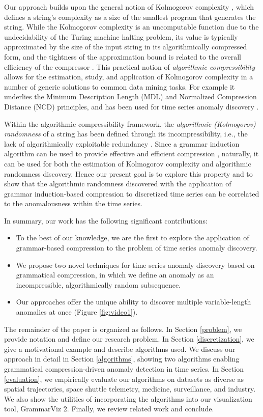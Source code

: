 \documentclass{sig-alternate}
\begin{document}
Our approach builds upon the general notion of Kolmogorov complexity \cite{kolmogorov}, which defines a string's complexity as a size of the smallest program that generates the string. While the Kolmogorov complexity is an uncomputable function due to the undecidability of the Turing machine halting problem, its value is typically approximated by the size of the input string in its algorithmically compressed form, and the tightness of the approximation bound is related to the overall efficiency of the compressor \cite{solomonoff, li_vitanyi}. This practical notion of \textit{algorithmic compressibility} allows for the estimation, study, and application of Kolmogorov complexity in a number of generic solutions to common data mining tasks. For example it underlies the Minimum Description Length (MDL) \cite{mdl} and Normalized Compression Distance (NCD) \cite{ncd} principles, and has been used for time series anomaly discovery \cite{param_free}.

Within the algorithmic compressibility framework, the \textit{algorithmic (Kolmogorov) randomness} of a string has been defined through its incompressibility, i.e., the lack of algorithmically exploitable redundancy \cite{li_vitanyi, mdl, grigorieff, per_lof}. Since a grammar induction algorithm can be used to provide effective and efficient compression  \cite{compression}, naturally, it can be used for both the estimation of Kolmogorov complexity and algorithmic randomness discovery. Hence our present goal is to explore this property and to show that the algorithmic randomness discovered with the application of grammar induction-based compression to discretized time series can be correlated to the anomalousness within the time series.

In summary, our work has the following significant contributions:
\begin{itemize}
\item To the best of our knowledge, we are the first to explore the application of grammar-based compression to the problem of time series anomaly discovery.
\item We propose two novel techniques for time series anomaly discovery based on grammatical compression, in which we define an anomaly as an incompressible, algorithmically random subsequence.
\item Our approaches offer the unique ability to discover multiple variable-length anomalies at once (Figure \ref{fig:video1}).
\end{itemize}
The remainder of the paper is organized as follows. In Section \ref{problem}, we provide notation and define our research problem. In Section \ref{discretization}, we give a motivational example and describe algorithms used. We discuss our approach in detail in Section \ref{algorithms}, showing two algorithms enabling grammatical compression-driven anomaly detection in time series. In Section \ref{evaluation}, we empirically evaluate our algorithms on datasets as diverse as spatial trajectories, space shuttle telemetry, medicine, surveillance, and industry. We also show the utilities of incorporating the algorithms into our visualization tool, GrammarViz 2. Finally, we review related work and conclude.
\end{document}

